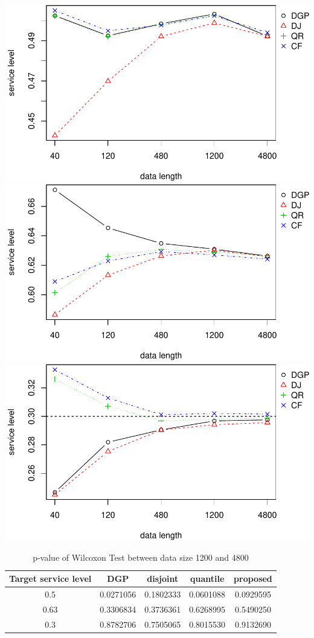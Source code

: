 \documentclass[
]{article}
\begin{document}
\includegraphics{linear-norm-plot_files/figure-latex/sl-1.pdf}
\includegraphics{linear-norm-plot_files/figure-latex/sl-2.pdf}
\includegraphics{linear-norm-plot_files/figure-latex/sl-3.pdf}

\begin{table}

\caption{\label{tab:Wilcoxon}p-value of Wilcoxon Test between data size 1200 and 4800}
\centering
\begin{tabular}[t]{ccccc}
\toprule
Target service level & DGP & disjoint & quantile & proposed\\
\midrule
\rowcolor{gray!6}  0.5 & 0.0271056 & 0.1802333 & 0.0601088 & 0.0929595\\
0.63 & 0.3306834 & 0.3736361 & 0.6268995 & 0.5490250\\
\rowcolor{gray!6}  0.3 & 0.8782706 & 0.7505065 & 0.8015530 & 0.9132690\\
\bottomrule
\end{tabular}
\end{table}
\end{document}
